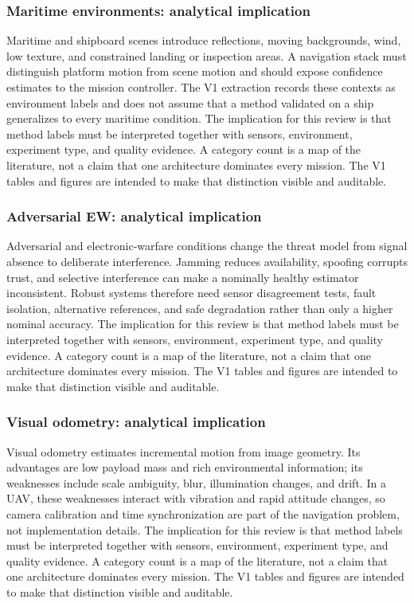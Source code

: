 \documentclass[
  journal,
  10pt]{IEEEtran}
\begin{document}
\subsubsection{Maritime environments: analytical
implication}\label{maritime-environments-analytical-implication-1}

Maritime and shipboard scenes introduce reflections, moving backgrounds,
wind, low texture, and constrained landing or inspection areas. A
navigation stack must distinguish platform motion from scene motion and
should expose confidence estimates to the mission controller. The V1
extraction records these contexts as environment labels and does not
assume that a method validated on a ship generalizes to every maritime
condition. The implication for this review is that method labels must be
interpreted together with sensors, environment, experiment type, and
quality evidence. A category count is a map of the literature, not a
claim that one architecture dominates every mission. The V1 tables and
figures are intended to make that distinction visible and auditable.

\subsubsection{Adversarial EW: analytical
implication}\label{adversarial-ew-analytical-implication-1}

Adversarial and electronic-warfare conditions change the threat model
from signal absence to deliberate interference. Jamming reduces
availability, spoofing corrupts trust, and selective interference can
make a nominally healthy estimator inconsistent. Robust systems
therefore need sensor disagreement tests, fault isolation, alternative
references, and safe degradation rather than only a higher nominal
accuracy. The implication for this review is that method labels must be
interpreted together with sensors, environment, experiment type, and
quality evidence. A category count is a map of the literature, not a
claim that one architecture dominates every mission. The V1 tables and
figures are intended to make that distinction visible and auditable.

\subsubsection{Visual odometry: analytical
implication}\label{visual-odometry-analytical-implication-1}

Visual odometry estimates incremental motion from image geometry. Its
advantages are low payload mass and rich environmental information; its
weaknesses include scale ambiguity, blur, illumination changes, and
drift. In a UAV, these weaknesses interact with vibration and rapid
attitude changes, so camera calibration and time synchronization are
part of the navigation problem, not implementation details. The
implication for this review is that method labels must be interpreted
together with sensors, environment, experiment type, and quality
evidence. A category count is a map of the literature, not a claim that
one architecture dominates every mission. The V1 tables and figures are
intended to make that distinction visible and auditable.
\end{document}
